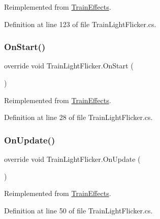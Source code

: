 Reimplemented from \mbox{\hyperlink{class_train_effects_abc55d7e7440cb7a076c7342c3cf74165}{Train\+Effects}}.



Definition at line 123 of file Train\+Light\+Flicker.\+cs.

\mbox{\label{class_train_light_flicker_a815f82ff9fe20dc1ea162df8eee0a6cf}} 
\subsubsection{\texorpdfstring{On\+Start()}{OnStart()}}
{\footnotesize\ttfamily override void Train\+Light\+Flicker.\+On\+Start (\begin{DoxyParamCaption}{ }\end{DoxyParamCaption})\hspace{0.3cm}{\ttfamily [virtual]}}



Reimplemented from \mbox{\hyperlink{class_train_effects_acabdc668bc9a6cf6d8d9e06fa5ccb071}{Train\+Effects}}.



Definition at line 28 of file Train\+Light\+Flicker.\+cs.

\mbox{\label{class_train_light_flicker_ad39662ddbaa2a6b30a2c1711cda88c54}} 
\subsubsection{\texorpdfstring{On\+Update()}{OnUpdate()}}
{\footnotesize\ttfamily override void Train\+Light\+Flicker.\+On\+Update (\begin{DoxyParamCaption}{ }\end{DoxyParamCaption})\hspace{0.3cm}{\ttfamily [virtual]}}



Reimplemented from \mbox{\hyperlink{class_train_effects_a245e2891464a93bda2d8f80c1fb53e2c}{Train\+Effects}}.



Definition at line 50 of file Train\+Light\+Flicker.\+cs.

